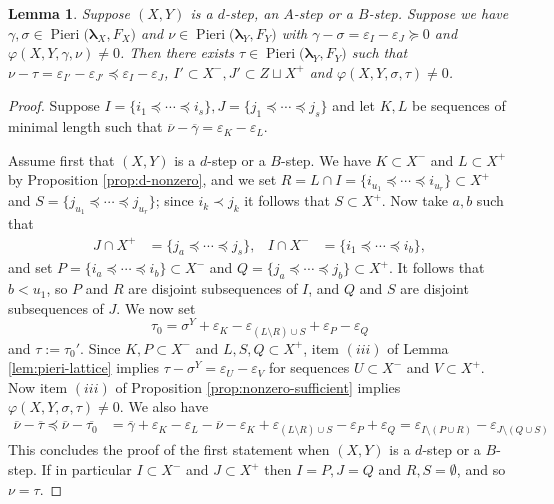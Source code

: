 \documentclass[11pt,fleqn]{amsart}
\renewcommand\phi{\varphi}
\renewcommand\epsilon{\varepsilon}
\newtheorem{lem}[thm]{Lemma}
\theoremstyle{definition}
\theoremstyle{remark}
\theoremstyle{remark}
\newcommand\wt[1]{\boldsymbol{#1}}
\newcommand\Pieri[2]{\operatorname{Pieri}{(#1},{#2)}}
\newcommand\map[4]{\phi(#3,#4,#1,#2)}
\begin{document}
\begin{lem}
\label{lem:approximation}
Suppose $(X,Y)$ is a $d$-step, an $A$-step or a $B$-step. Suppose we have 
$\gamma, \sigma \in \Pieri{\wt\lambda_X}{F_X}$ and $\nu \in 
\Pieri{\wt\lambda_Y}{F_Y}$ with $\gamma - \sigma = \epsilon_I 
- \epsilon_J \succeq 0$ and $\map{\gamma}{\nu}{X}{Y}\neq 0$. 
Then there exists $\tau \in \Pieri{\wt\lambda_Y}{F_Y}$ such that $\nu - 
\tau = \epsilon_{I'} - \epsilon_{J'} \preceq \epsilon_{I} - \epsilon_{J}$,
$I' \subset X^-, J' \subset Z \sqcup X^+$ and $\map{\sigma}{\tau}{X}{Y} \neq 
0$. 
\end{lem}
\begin{proof}
Suppose $I = \{i_1 \preceq \cdots \preceq i_s\}, J = \{j_1 \preceq \cdots 
\preceq j_s\}$ and let $K, L$ be sequences of minimal length such that 
$\overline{\nu} - \overline{\gamma} = \epsilon_K - \epsilon_L$. 

Assume first that $(X,Y)$ is a $d$-step or a $B$-step. We have $K \subset X^-$ 
and $L \subset X^+$ by Proposition \ref{prop:d-nonzero}, and we set $R = L 
\cap I = \{i_{u_1} \preceq \cdots \preceq i_{u_r}\} \subset X^+$ and 
$S = \{j_{u_1} \preceq \cdots \preceq j_{u_r}\}$; since $i_k \prec j_k$ it 
follows that $S \subset X^+$. Now take $a,b$ such that
\begin{align*}
  J \cap X^+ 
    &= \{j_a \preceq \cdots \preceq j_s\}, 
  &I \cap X^- 
    &= \{i_1 \preceq \cdots \preceq i_b\},
\end{align*}
and set $P = \{i_a \preceq \cdots \preceq i_b\} \subset X^-$ and $Q = 
\{j_a \preceq \cdots \preceq j_b\} \subset X^+$. It follows that $b < u_1$, 
so $P$ and $R$ are disjoint subsequences of $I$, and $Q$ and $S$ are disjoint 
subsequences of $J$. We now set
\[
  \tau_0 
    = \sigma^Y + \epsilon_K - \epsilon_{(L \setminus R) 
      \cup S} + \epsilon_{P} - \epsilon_{Q}
\]
and $\tau := \tau_0'$. 
Since $K, P \subset X^-$ and $L, S, Q \subset X^+$, item $(iii)$ of Lemma 
\ref{lem:pieri-lattice} implies $\tau - \sigma^Y = \epsilon_U - \epsilon_V$
for sequences $U \subset X^-$ and $V \subset X^+$. Now item $(iii)$ of 
Proposition \ref{prop:nonzero-sufficient} implies $\map{\sigma}{\tau}{X}{Y}
\neq 0$. We also have
\begin{align*}
  \overline{\nu} - \overline{\tau} 
  \preceq
  \overline{\nu} - \overline{\tau_0}
    &= \overline{\gamma} + \epsilon_K - \epsilon_L - 
      \overline{\nu} - \epsilon_K + \epsilon_{(L \setminus R) \cup S} 
        - \epsilon_{P} + \epsilon_{Q} 
    = \epsilon_{I \setminus (P \cup R)} - \epsilon_{J \setminus (Q \cup S)}
\end{align*}
This concludes the proof of the first statement when $(X,Y)$ is a $d$-step or a 
$B$-step. If in particular $I \subset X^-$ and $J \subset X^+$ then $I = P, J 
= Q$ and $R,S = \emptyset$, and so $\nu = \tau$.


\end{proof}
\end{document}
